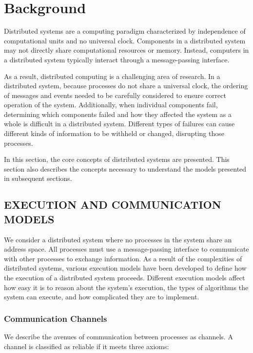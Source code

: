 \chapter{Background}

Distributed systems are a computing paradigm characterized by independence of computational units and no universal clock.
Components in a distributed system may not directly share computational resources or memory.
Instead, computers in a distributed system typically interact through a message-passing interface.

As a result, distributed computing is a challenging area of research.
In a distributed system, because processes do not share a universal clock, the ordering of messages and events needed to be carefully considered to ensure correct operation of the system.
Additionally, when individual components fail, determining which components failed and how they affected the system as a whole is difficult in a distributed system.
Different types of failures can cause different kinds of information to be withheld or changed, disrupting those processes.

In this section, the core concepts of distributed systems are presented.
This section also describes the concepts necessary to understand the models presented in subsequent sections.

\section{EXECUTION AND COMMUNICATION MODELS}

We consider a distributed system where no processes in the system share an address space.
All processes must use a message-passing interface to communicate with other processes to exchange information.
As a result of the complexities of distributed systems, various execution models have been developed to define how the execution of a distributed system proceeds.
Different execution models affect how easy it is to reason about the system's execution, the types of algorithms the system can execute, and how complicated they are to implement.

\subsection{Communication Channels}
We describe the avenues of communication between processes as channels.
A channel is classified as reliable if it meets three axioms\cite{DISTRIBUTED}:

